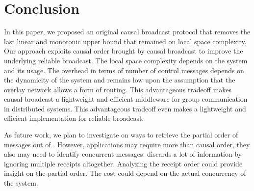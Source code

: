 
\section{Conclusion}
\label{sec:conclusion}


In this paper, we proposed an original causal broadcast protocol that removes
the last linear and monotonic upper bound that remained on local space
complexity. Our approach exploits causal order brought by causal broadcast to
improve the underlying reliable broadcast. The local space complexity depends on
the system and its usage. The overhead in terms of number of control messages
depends on the dynamicity of the system and remains low upon the assumption that
the overlay network allows a form of routing.
This advantageous tradeoff makes causal broadcast a lightweight and efficient
middleware for group communication in distributed systems. This advantageous
tradeoff even makes \RPCBROADCAST a lightweight and efficient implementation for
reliable broadcast. %

As future work, we plan to investigate on ways to retrieve the partial order of
messages out of \RPCBROADCAST. %
However, applications may require more than causal order, they also may need to
identify concurrent messages. \RPCBROADCAST discards a lot of information by
ignoring multiple receipts altogether. Analyzing the receipt order could provide
insight on the partial order. The cost could depend on the actual concurrency of
the system.

